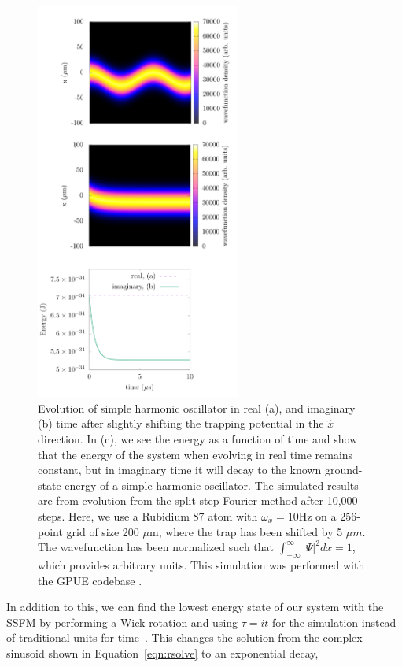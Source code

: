 \begin{figure}

\center \includegraphics[width=0.6\textwidth]{data/splitop/SHO/SHO_gimp.pdf}

\caption{Evolution of simple harmonic oscillator in real (a), and imaginary (b) time after slightly shifting the trapping potential in the $\hat x$ direction.
In (c), we see the energy as a function of time and show that the energy of the system when evolving in real time remains constant, but in imaginary time it will decay to the known ground-state energy of a simple harmonic oscillator.
The simulated results are from evolution from the split-step Fourier method after 10,000 steps.
Here, we use a Rubidium 87 atom with $\omega_x = 10$Hz on a 256-point grid of size 200 $\mu$m, where the trap has been shifted by 5 $\mu m$.
The wavefunction has been normalized such that $\int_{-\infty}^\infty|\Psi|^2 dx = 1$, which provides arbitrary units.
This simulation was performed with the GPUE codebase \cite{schloss2018}.
}
\label{fig:evolve}
\end{figure}

In addition to this, we can find the lowest energy state of our system with the SSFM by performing a Wick rotation and using $\tau = it$ for the simulation instead of traditional units for time~\cite{wick1954}.
This changes the solution from the complex sinusoid shown in Equation~\eqref{eqn:rsolve} to an exponential decay,

